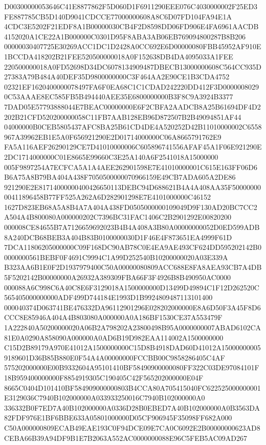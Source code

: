 \documentclass[UTF8,fontset=fandol,zihao=-4,a4paper]{ctexart}
\begin{document}
{{D00300000053646C41E8877862F5D060D1F6911290EEE076C4030000002F25ED3FE887785CB5D140D9041CDCCE77000000608A8C6D07FD104FA94E1A
4CDC3E5202F21EDF8A1B00000030CB4F2D8598DD06FD906E4FA6961AACDB4152020A1CE22A1B000000C0301D95F8ABA3AB06EB769094800287B8B206
00000030407725E30269ACC1DC1D2428A0CC692E6D00000080FBB45952AF910E1BCCDA418202B21FEE520500000018A0F152638DB4DA4095033A1FEE
220500000018A0FD52698D34DC6078134909487DBECB13000000608C564CC935D27383A79B484A40DEF35D9800000000C3F464AA2E90CE1B3CDA4752
02321EF1620400000078497FA6F0EA68C1C1CDAD242220DD412F3D00000080290C53AAAE8EC585FB5B494440AEE35E6800000000B3F8C9A3924B3377
7DAD05E57793888044E7BEAC00000000E6F2CBFA2AADCB8A25B61694DF4D2202B21CFD520200000058C11FB7AAB128EB96D872507B2B49094851AF44
04000000B0CEB5805437AFC8BA25B61CD4DE4A520252D42B11010000002C6558967A39962EB1E5A0F656921290E2D01714000000C06A8665791762E9
FA5A116AEF26290129CE7D41010000006C605896741556AFAF45A1F06E921290E2DC1714000000C01E8665E99660C3E25A140A6F2541018A15000000
005F9897254A7ECFCA5A1A4AEE262901598E7E41010000001C615E163FF06D6B6A75A8B79BA404A438F7050500000070966159E49CB7ADA605A2DE86
921290E2E81714000000400426650113DEBC94D688621B4A4A408AA35F5000000000411896458B77FF525A262A6D282901298E7E4101000000C46152
1627D823EB68A5A8B4A7A404A438FD0505000000109049D9F130AD20BC7CC2A504A4B800080A000000202C7396BC31FAC1406C2B2901292E00820200
000008CE84655B7A7126659692023B4B4A408A3B80A00000000052D0ED599ADB8A240DCB68BEB3A404B83B0100000030D1F46E4F873651EA4999F61D
7DCA11806205000000C09F168DC90AB78C0E4EA9AE493CF624DD595202142B00000000561BEBF0F4691C9994C1A99D252540B10200000020A03E339A
B323AA6B1E0F2D1937979400C50A00000080809ACC688E8FA8AEA93CB7A4DB5F5202142B00000000A26932A389309FBA66F3F4926B8B490950AC0000
000088A6C998C6A40C8E6F3129018A1500000000D13499D49894C1F12D262520C565405000000000ADF499D744184E1993D1B9924809487113101400
000040374D063741BE476332DA96112901296E028202000000E8A6D50F3A45F8D6CCC8E85946A404A4B803080A000000A0A186BF1530CE37A553479F
1A222840A50200000020A06B2A798202A23800498B95A0000000007ABAD6102CA81E0A0290A858090A000000A0AD6B19D982EAA114002A1500000000
C15D2B89179A970E41012A1500000000C15D8B4918DAD60D41012A150000000059189601D36B85B880E0F54A4A00000000FCCBB00C9858286405C4AF
575202000000E00B9332604A95101410BF58490900000080FF322C03DE97084101F18B959400000000F8854919305C190405C42F565202000000E04F
8665C0404D101410BF584909000000803B4CCA80A705415040FC622525000000001E3129036C7940B102000000A033933250016C7940B102000000A0
336332B0F7ED7A40B102000000A0336D28B0EBED7A40B102000000A0B3563DA82FDF976E1BF6BBE633A05801000000D05CF906945F35098FF682A000
C50A000000809ECAB49EAE193C0F94DCE09E7CA0C6092E2B00000000623AD8CEBA66B39A94DF9B1E7B2063A552AC0000000088E96C5FEB5AC09AD267
}}
\end{document}
